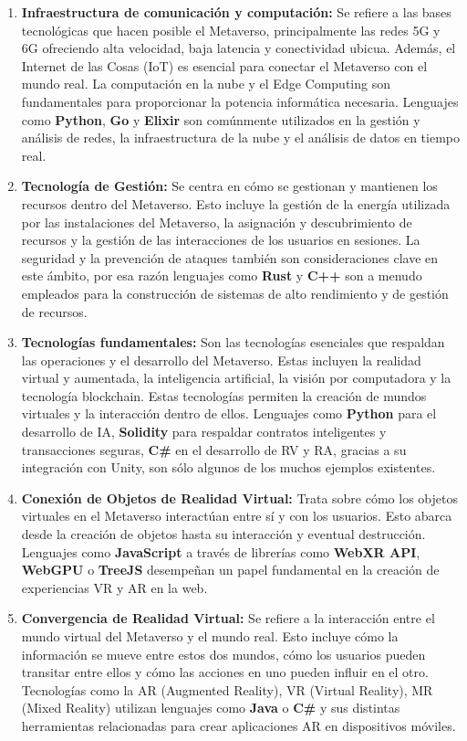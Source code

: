 \documentclass[a4paper,10pt]{article}
\begin{document}
	\begin{enumerate}
		\item \textbf{Infraestructura de comunicación y computación:} Se refiere a las bases tecnológicas que hacen posible el Metaverso, principalmente las redes 5G y 6G ofreciendo alta velocidad, baja latencia y conectividad ubicua. Además, el Internet de las Cosas (IoT) es esencial para conectar el Metaverso con el mundo real. La computación en la nube y el Edge Computing son fundamentales para proporcionar la potencia informática necesaria. Lenguajes como \textbf{Python}, \textbf{Go} y \textbf{Elixir} son comúnmente utilizados en la gestión y análisis de redes, la infraestructura de la nube y el análisis de datos en tiempo real.
		\item \textbf{Tecnología de Gestión:} Se centra en cómo se gestionan y mantienen los recursos dentro del Metaverso. Esto incluye la gestión de la energía utilizada por las instalaciones del Metaverso, la asignación y descubrimiento de recursos y la gestión de las interacciones de los usuarios en sesiones. La seguridad y la prevención de ataques también son consideraciones clave en este ámbito, por esa razón lenguajes como \textbf{Rust} y \textbf{C++} son a menudo empleados para la construcción de sistemas de alto rendimiento y de gestión de recursos.
		\item \textbf{Tecnologías fundamentales:} Son las tecnologías esenciales que respaldan las operaciones y el desarrollo del Metaverso. Estas incluyen la realidad virtual y aumentada, la inteligencia artificial, la visión por computadora y la tecnología blockchain. Estas tecnologías permiten la creación de mundos virtuales y la interacción dentro de ellos. Lenguajes como \textbf{Python} para el desarrollo de IA, \textbf{Solidity} para respaldar contratos inteligentes y transacciones seguras, \textbf{C\#} en el desarrollo de RV y RA, gracias a su integración con Unity, son sólo algunos de los muchos ejemplos existentes.
		\item \textbf{Conexión de Objetos de Realidad Virtual:} Trata sobre cómo los objetos virtuales en el Metaverso interactúan entre sí y con los usuarios. Esto abarca desde la creación de objetos hasta su interacción y eventual destrucción. Lenguajes como \textbf{JavaScript} a través de librerías como \textbf{WebXR API}, \textbf{WebGPU} o \textbf{TreeJS} desempeñan un papel fundamental en la creación de experiencias VR y AR en la web.
		\item \textbf{Convergencia de Realidad Virtual:} Se refiere a la interacción entre el mundo virtual del Metaverso y el mundo real. Esto incluye cómo la información se mueve entre estos dos mundos, cómo los usuarios pueden transitar entre ellos y cómo las acciones en uno pueden influir en el otro. Tecnologías como la AR (Augmented Reality), VR (Virtual Reality), MR (Mixed Reality) utilizan lenguajes como \textbf{Java} o \textbf{C\#} y sus distintas herramientas relacionadas para crear aplicaciones AR en dispositivos móviles.
	\end{enumerate}
\end{document}
